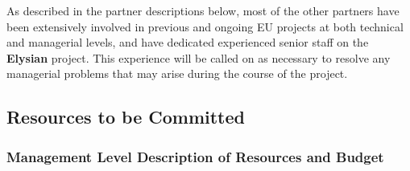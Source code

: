 \documentclass[a4paper,11pt]{article}
\newcommand{\project}[1]{\textbf{#1}\xspace}
\newcommand{\SECURITY}{\project{Elysian}}
\newcommand{\TheProject}{\SECURITY}
\begin{document}
As described in the partner descriptions below,
most of the other partners have been extensively involved in previous and
ongoing EU projects at both technical and managerial
levels, and have dedicated experienced senior staff on the \TheProject{} project.
%
This experience will be called on as necessary to resolve any
managerial problems that may arise during the course of the
project.


\subsection{Resources to be Committed}




\subsubsection{Management Level Description of Resources and Budget}
\vspace{-6pt}

\end{document}
